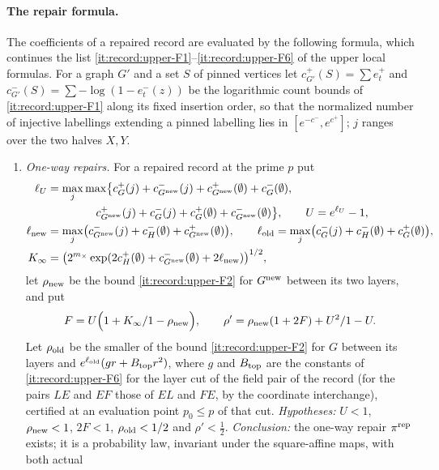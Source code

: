 \paragraph{The repair formula.}
The coefficients of a repaired record are evaluated by the following formula,
which continues the list \ref{it:record:upper-F1}--\ref{it:record:upper-F6}
of the upper local formulas. For a graph $G'$ and a set $S$ of pinned
vertices let $c^+_{G'}(S)=\sum e^+_t$ and $c^-_{G'}(S)=\sum-\log(1-e^-_t(z))$ be the
logarithmic count bounds of \ref{it:record:upper-F1} along its fixed
insertion order, so that the normalized number of injective labellings
extending a pinned labelling lies in $[e^{-c^-},e^{c^+}]$; $j$ ranges over the
two halves $X,Y$.
\begin{enumerate}[label=\textup{(F\arabic*)},start=7]
\item\label{it:record:upper-F7} \emph{One-way repairs.} For a repaired record
 at the prime $p$ put
 \begin{align*}
  \ell_U&=\max_j\max\bigl\{c^+_G(j)+c^-_{G^{\rm new}}(j)+c^+_{G^{\rm new}}(\emptyset)
  +c^-_G(\emptyset),\\
  &\qquad\qquad\ c^+_{G^{\rm new}}(j)+c^-_G(j)+c^+_G(\emptyset)
  +c^-_{G^{\rm new}}(\emptyset)\bigr\},\qquad U=e^{\ell_U}-1,\\
  \ell_{\rm new}&=\max_j\bigl(c^-_{G^{\rm new}}(j)+c^-_H(\emptyset)
  +c^+_{G^{\rm new}}(\emptyset)\bigr),\qquad
  \ell_{\rm old}=\max_j\bigl(c^-_G(j)+c^-_H(\emptyset)+c^+_G(\emptyset)\bigr),\\
  K_\infty&=\bigl(2^{m_\times}\exp(2c^+_H(\emptyset)+c^-_{G^{\rm new}}(\emptyset)
  +2\ell_{\rm new})\bigr)^{1/2},
 \end{align*}
 let $\rho_{\rm new}$ be the bound \ref{it:record:upper-F2} for
 $G^{\rm new}$ between its two layers, and put
 \[
  F=U\Bigl(1+\frac{K_\infty}{1-\rho_{\rm new}}\Bigr),\qquad
  \rho'=\frac{\rho_{\rm new}(1+2F)+U^2}{1-U}.
 \]
 Let $\rho_{\rm old}$ be the smaller of the bound \ref{it:record:upper-F2}
 for $G$ between its layers and $e^{\ell_{\rm old}}(gr+B_{\rm top}r^2)$,
 where $g$ and $B_{\rm top}$ are the constants of \ref{it:record:upper-F6}
 for the layer cut of the field pair of the record (for the pairs $LE$ and
 $EF$ those of $EL$ and $FE$, by the coordinate interchange), certified at an
 evaluation point $p_0\le p$ of that cut. \emph{Hypotheses:} $U<1$,
 $\rho_{\rm new}<1$, $2F<1$, $\rho_{\rm old}<\frac12$ and $\rho'<\frac12$.
 \emph{Conclusion:} the one-way repair $\pi^{\rm rep}$ exists; it is a
 probability law, invariant under the square-affine maps, with both actual

\end{enumerate}
